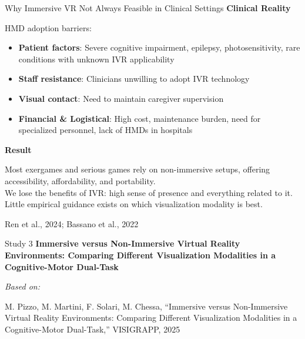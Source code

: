 \documentclass[aspectratio=169, 12pt]{beamer}
\newcommand{\citefooter}[1]{\hfill{\tiny #1}}
\begin{document}
\begin{frame}{Why Immersive VR Not Always Feasible in Clinical Settings}
	\textbf{\textcolor{gbAqua}{Clinical Reality}}
	
	HMD adoption barriers:
	
	\begin{itemize}
		\item \textbf{Patient factors}: Severe cognitive impairment, epilepsy, photosensitivity, rare conditions with unknown IVR applicability
		\item \textbf{Staff resistance}: Clinicians unwilling to adopt IVR technology
		\item \textbf{Visual contact}: Need to maintain caregiver supervision
		\item \textbf{Financial \& Logistical}: High cost, maintenance burden, need for specialized personnel, lack of HMDs in hospitals
	\end{itemize}
	
	\vspace{0.3cm}
	
	\textbf{\textcolor{gbAqua}{Result}}
	
	Most exergames and serious games rely on non-immersive setups, offering accessibility, affordability, and portability.
	\\We lose the benefits of IVR: high sense of presence and everything related to it.
	\\Little empirical guidance exists on which visualization modality is best.
	
	\citefooter{Ren et al., 2024; Bassano et al., 2022}
\end{frame}


\begin{frame}{Study 3}
	\textbf{\textcolor{gbAqua}{Immersive versus Non-Immersive Virtual Reality Environments: Comparing Different Visualization Modalities in a Cognitive-Motor Dual-Task}}
	
	\vspace{0.5cm}
	
	\small\textit{Based on:}
	
	\vspace{0.2cm}
	
	{\footnotesize M. Pizzo, M. Martini, F. Solari, M. Chessa, ``Immersive versus Non-Immersive Virtual Reality Environments: Comparing Different Visualization Modalities in a Cognitive-Motor Dual-Task,'' VISIGRAPP, 2025}
\end{frame}
\end{document}
